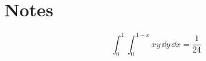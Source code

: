 \documentclass{article}
\begin{document}
\section{Notes}

\[
  \int_0^1\int_0^{1-x}xy\,\dd y\,\dd x = \frac{1}{24}
\]
\end{document}

